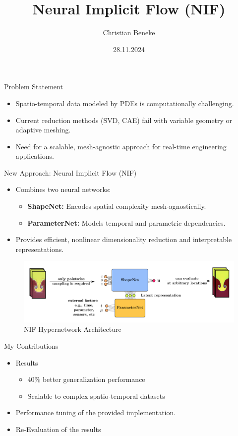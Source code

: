 \documentclass{beamer}
\title{Neural Implicit Flow (NIF)}
\author{Christian Beneke}
\date{28.11.2024}
\begin{document}
\frame{\titlepage}

\begin{frame}{Problem Statement}
\begin{itemize}
    \item Spatio-temporal data modeled by PDEs is computationally challenging.
    \item Current reduction methods (SVD, CAE) fail with variable geometry or adaptive meshing.
    \item Need for a scalable, mesh-agnostic approach for real-time engineering applications.
\end{itemize}
\end{frame}

\begin{frame}{New Approach: Neural Implicit Flow (NIF)}
\begin{itemize}
    \item Combines two neural networks:
    \begin{itemize}
        \item \textbf{ShapeNet:} Encodes spatial complexity mesh-agnostically.
        \item \textbf{ParameterNet:} Models temporal and parametric dependencies.
    \end{itemize}
    \item Provides efficient, nonlinear dimensionality reduction and interpretable representations.
\end{itemize}
\begin{figure}
    \includegraphics[width=0.6\linewidth]{hypernetwork_diagram.png}
    \caption{NIF Hypernetwork Architecture}
\end{figure}
\end{frame}

\begin{frame}{My Contributions}
\begin{itemize}
    \item Results
    \begin{itemize}
        \item 40\% better generalization performance
        \item Scalable to complex spatio-temporal datasets
    \end{itemize}
    \item Performance tuning of the provided implementation.
    \item Re-Evaluation of the results
\end{itemize}
\end{frame}
\end{document}
